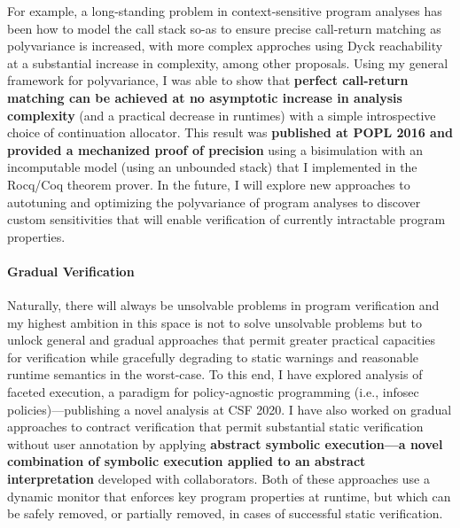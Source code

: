 \documentclass[12pt]{article}
\begin{document}
For example, a long-standing problem in context-sensitive program analyses has been how to model the call stack so-as to ensure precise call-return matching as polyvariance is increased, with more complex approches using Dyck reachability at a substantial increase in complexity, among other proposals. Using my general framework for polyvariance, I was able to show that \textbf{perfect call-return matching can be achieved at no asymptotic increase in analysis complexity} (and a practical decrease in runtimes) with a simple introspective choice of continuation allocator. This result was \textbf{published at POPL 2016 and provided a mechanized proof of precision} using a bisimulation with an incomputable model (using an unbounded stack) that I implemented in the Rocq/Coq theorem prover. In the future, I will explore new approaches to autotuning and optimizing the polyvariance of program analyses to discover custom sensitivities that will enable verification of currently intractable program properties.

\paragraph{Gradual Verification}

Naturally, there will always be unsolvable problems in program verification and my highest ambition in this space is not to solve unsolvable problems but to unlock general and gradual approaches that permit greater practical capacities for verification while gracefully degrading to static warnings and reasonable runtime semantics in the worst-case. To this end, I have explored analysis of faceted execution, a paradigm for policy-agnostic programming (i.e., infosec policies)---publishing a novel analysis at CSF 2020. I have also worked on gradual approaches to contract verification that permit substantial static verification without user annotation by applying \textbf{abstract symbolic execution---a novel combination of symbolic execution applied to an abstract interpretation} developed with collaborators. Both of these approaches use a dynamic monitor that enforces key program properties at runtime, but which can be safely removed, or partially removed, in cases of successful static verification.  
\end{document}
